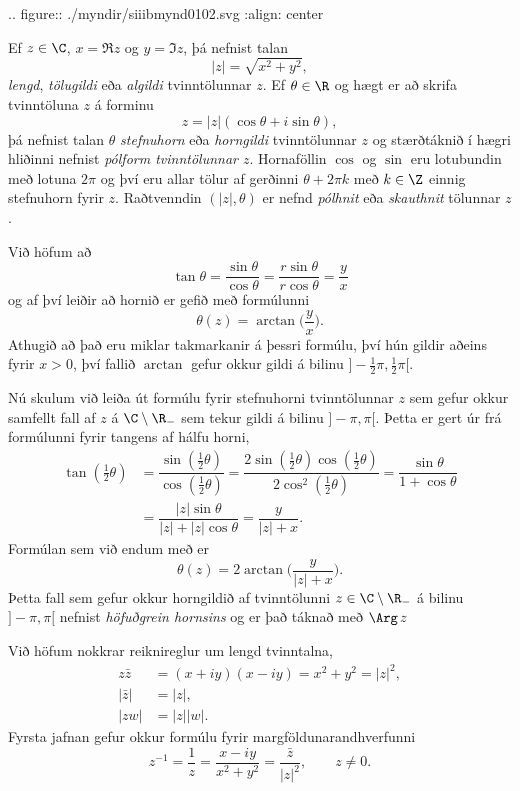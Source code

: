 .. figure:: ./myndir/siiibmynd0102.svg
    :align: center

    

  
Ef $z\in \C$, $x=\Re z$ og $y=\Im z$, þá nefnist talan
$$
|z|=\sqrt{x^ 2+y^2},
$$
{\it lengd}, {\it tölugildi } eða {\it algildi } tvinntölunnar
$z$.  
Ef $\theta\in \R$ og hægt er að skrifa tvinntöluna $z$ 
á forminu $$
z=|z|(\cos \theta +i\sin \theta),
$$
þá nefnist talan $\theta$ {\it stefnuhorn} eða 
{\it horngildi } tvinntölunnar $z$ og stærðtáknið í hægri hliðinni
nefnist {\it pólform tvinntölunnar $z$}.
Hornaföllin $\cos$ og $\sin$ eru lotubundin með lotuna 
$2\pi$ og því eru allar tölur af gerðinni $\theta+2\pi k$
með $k\in \Z$ einnig stefnuhorn fyrir $z$.  
Raðtvenndin $(|z|,\theta)$ er nefnd {\it pólhnit}
eða {\it skauthnit} tölunnar $z$.

Við höfum að $$
\tan \theta=\dfrac{\sin\theta}{\cos\theta}
=\dfrac{r\sin\theta}{r\cos\theta}=\dfrac yx
$$
og af því leiðir að hornið er gefið með formúlunni
$$
\theta(z)=\arctan\bigg(\dfrac yx\bigg).
$$
Athugið að það eru miklar takmarkanir á þessri formúlu, því hún gildir
aðeins fyrir $x>0$, því fallið $\arctan$ gefur okkur gildi á bilinu
$]-\tfrac 12 \pi,\tfrac 12 \pi[$.  

Nú skulum við leiða út formúlu fyrir stefnuhorni tvinntölunnar 
$z$ sem gefur okkur samfellt fall af $z$ á $\C\setminus \R_-$ sem
tekur gildi á bilinu $]-\pi,\pi[$. Þetta er gert úr frá formúlunni
fyrir tangens af hálfu horni,
\begin{align*}
\tan(\tfrac 12\theta)&=\dfrac{\sin(\tfrac 12\theta)}{\cos(\tfrac
12\theta)} = \dfrac{2\sin(\tfrac 12\theta)\cos(\tfrac 12\theta)}
{2\cos^2(\tfrac 12\theta)}=\dfrac{\sin \theta}{1+\cos\theta}  \\
&=\dfrac{|z|\sin \theta}{|z|+|z|\cos\theta}=\dfrac y{|z|+x}.
\end{align*}
Formúlan sem við endum með er
$$
\theta(z)=2\arctan\bigg(\dfrac y{|z|+x}\bigg).
$$
Þetta fall sem gefur okkur horngildið af tvinntölunni
$z\in \C\setminus \R_-$  á bilinu $]-\pi,\pi[$
nefnist {\it höfuðgrein hornsins} og er það táknað með
$\Arg \, z$

Við höfum nokkrar reiknireglur um lengd tvinntalna,
\begin{align*}
  z\bar z&=(x+iy)(x-iy)=x^2+y^2=|z|^2,\\
|\bar z|&=|z|,\\
|zw|&=|z||w|.
\end{align*}
Fyrsta jafnan  gefur okkur 
formúlu fyrir margföldunarandhverfunni
$$
z^{-1}=\dfrac 1z=\dfrac{x-iy}{x^2+y^2}=\dfrac{\bar z}{|z|^2}, \qquad z\neq 0.
$$

